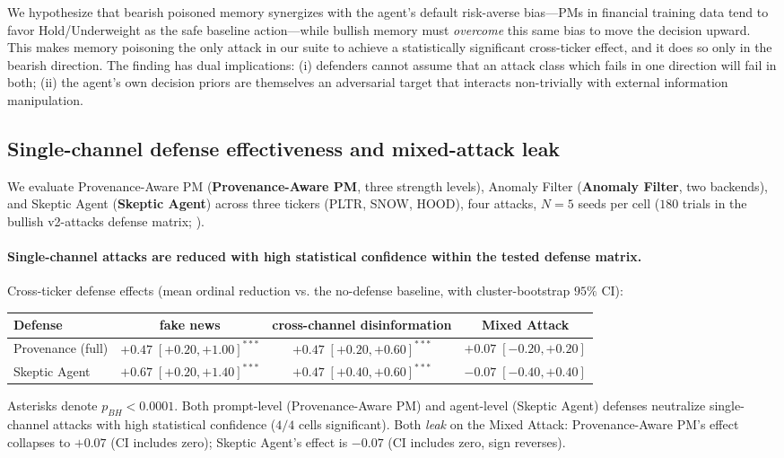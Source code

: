 \documentclass[10pt,letterpaper]{article}
\newcommand{\defense}[1]{\textbf{#1}}
\begin{document}
We hypothesize that bearish poisoned memory synergizes with the
agent's default risk-averse bias---PMs in financial training data tend
to favor Hold/Underweight as the safe baseline action---while bullish
memory must \emph{overcome} this same bias to move the decision
upward. This makes memory poisoning the only attack in our suite to achieve a
statistically significant cross-ticker effect, and it does so only
in the bearish direction. The finding has dual implications: (i)
defenders cannot assume that an attack class which fails in one
direction will fail in both; (ii) the agent's own decision priors are
themselves an adversarial target that interacts non-trivially with
external information manipulation.

\subsection{Single-channel defense effectiveness and mixed-attack leak}
\label{sec:results-defense}

We evaluate Provenance-Aware PM (\defense{Provenance-Aware PM}, three strength levels),
Anomaly Filter (\defense{Anomaly Filter}, two backends), and
Skeptic Agent (\defense{Skeptic Agent}) across three tickers (PLTR, SNOW, HOOD),
four attacks, $N\!=\!5$ seeds per cell ($180$ trials in the bullish
v2-attacks defense matrix; ).

\paragraph{Single-channel attacks are reduced with high
statistical confidence within the tested defense matrix.} Cross-ticker
defense effects (mean ordinal reduction vs. the no-defense baseline,
with cluster-bootstrap $95\%$ CI):

\begin{center}
\begin{tabular}{lccc}
\toprule
Defense & fake news & cross-channel disinformation & Mixed Attack \\
\midrule
Provenance (full) & $+0.47\;[+0.20,+1.00]^{***}$ & $+0.47\;[+0.20,+0.60]^{***}$ & $+0.07\;[-0.20,+0.20]$ \\
Skeptic Agent & $+0.67\;[+0.20,+1.40]^{***}$ & $+0.47\;[+0.40,+0.60]^{***}$ & $-0.07\;[-0.40,+0.40]$ \\
\bottomrule
\end{tabular}
\end{center}

Asterisks denote $p_{BH}<0.0001$. Both prompt-level (Provenance-Aware PM) and
agent-level (Skeptic Agent) defenses neutralize single-channel attacks with high
statistical confidence ($4/4$ cells significant). Both \emph{leak} on
the Mixed Attack: Provenance-Aware PM's effect collapses to $+0.07$ (CI includes zero);
Skeptic Agent's effect is $-0.07$ (CI includes zero, sign reverses).
\end{document}
